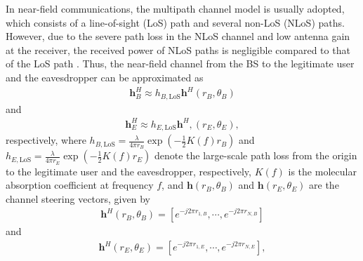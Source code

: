 \documentclass[10pt,technote]{IEEEtran}
\newcommand{\1}{\mathbbm{1}}
\begin{document}
In near-field communications, the multipath channel model is usually adopted, which consists of a line-of-sight (LoS) path and several non-LoS (NLoS) paths. However, due to the severe path loss in the NLoS channel and low antenna gain at the receiver, the received power of NLoS paths is negligible compared to that of the LoS path \cite{Bodet2024}. 
Thus, the near-field channel from the BS to the legitimate user and the eavesdropper can be approximated as
\begin{align}
\mathbf{h}_{B}^{H} \approx h_{B,\mathrm{LoS}}\mathbf{h}^{H}(r_B,\theta_B)
\end{align}
and
\begin{align}
\mathbf{h}_{E}^{H} \approx h_{E,\mathrm{LoS}}\mathbf{h}^{H},(r_E,\theta_E) ,
\end{align}
respectively, where $h_{B,\mathrm{LoS}} = \frac{\lambda}{4\pi  r_{B}}\exp\left(-\frac{1}{2}K(f)r_B\right)$ and $h_{E,\mathrm{LoS}} = \frac{\lambda}{4\pi  r_{E}}\exp\left(-\frac{1}{2}K(f)r_E\right)$ denote the large-scale path loss from the origin to the legitimate user and the eavesdropper, respectively, $K(f)$ is the molecular absorption coefficient at frequency $f$, and $\mathbf{h}(r_B,\theta_B)$ and $\mathbf{h}(r_E,\theta_E)$ are the channel steering vectors, given by
\begin{align}
\mathbf{h}^H(r_B,\theta_B) = \left[e^{-j2\pi r_{1,B}},\cdots,e^{-j2\pi r_{N,B}}\right]
\end{align}
and
\begin{align}
\mathbf{h}^H(r_E,\theta_E) = \left[e^{-j2\pi r_{1,E}},\cdots,e^{-j2\pi r_{N,E}}\right],
\end{align}
\end{document}
